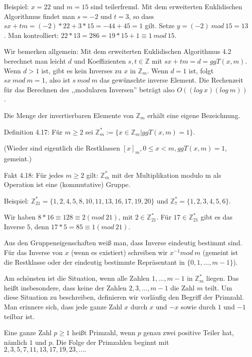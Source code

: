 \documentclass[a4paper]{article}
\begin{document}
\begin{multicols}{3}
    Beispiel: $x=22$ und $m=15$ sind teilerfremd. Mit dem erweiterten Euklidischen Algorithmus findet man $s=-2$ und $t=3$, so dass $sx+tm=(-2)*22 + 3*15 =-44 + 45 = 1$ gilt. Setze $y=(-2)\ mod\ 15 = 13$. Man kontrolliert: $22*13 =286=19 *15 + 1\equiv 1\ mod\ 15$.

    Wir bemerken allgemein: Mit dem erweiterten Euklidischen Algorithmus 4.2 berechnet man leicht $d$ und Koeffizienten $s,t\in\mathbb{Z}$ mit $sx+tm= d= ggT(x,m)$. Wenn $d>1$ ist, gibt es kein Inverses zu $x$ in $\mathbb{Z}_m$. Wenn $d=1$ ist, folgt $sx\ mod\ m=1$, also ist $s\ mod\ m$ das gewünschte inverse Element. Die Rechenzeit für das Berechnen des ,,modularen Inversen'' beträgt also $O((log\ x)(log\ m))$.

    Die Menge der invertierbaren Elemente von $\mathbb{Z}_m$ erhält eine eigene Bezeichnung.

    Definition 4.17: Für $m\geq 2$ sei $\mathbb{Z}^*_m:=\{x\in\mathbb{Z}_m| ggT(x,m)=1\}$.

    (Wieder sind eigentlich die Restklassen $[x]_m, 0\leq x < m, ggT(x,m) = 1$, gemeint.)

    Fakt 4.18: Für jedes $m\geq 2$ gilt: $\mathbb{Z}^*_m$ mit der Multiplikation modulo m als Operation ist eine (kommutative) Gruppe.

    Beispiel: $\mathbb{Z}^*_{21}=\{1,2,4,5,8,10,11,13,16,17,19,20\}$ und $\mathbb{Z}^*_7=\{1,2,3,4,5,6\}$.

    Wir haben $8*16 \equiv 128 \equiv 2 (mod\ 21)$, mit $2\in\mathbb{Z}^*_{21}$. Für $17\in\mathbb{Z}^*_{21}$ gibt es das Inverse $5$, denn $17*5 = 85\equiv 1 (mod\ 21)$.

    Aus den Gruppeneigenschaften weiß man, dass Inverse eindeutig bestimmt sind. Für das Inverse von $x$ (wenn es existiert) schreiben wir $x^{-1} mod\ m$ (gemeint ist die Restklasse oder der eindeutig bestimmte Repräsentant in $\{0,1 ,...,m-1\}$).

    Am schönsten ist die Situation, wenn alle Zahlen $1,...,m-1$ in $\mathbb{Z}^*_m$ liegen. Das heißt insbesondere, dass keine der Zahlen $2, 3 ,...,m-1$ die Zahl $m$ teilt. Um diese Situation zu beschreiben, definieren wir vorläufig den Begriff der Primzahl. Man erinnere sich, dass jede ganze Zahl $x$ durch $x$ und $-x$ sowie durch $1$ und $-1$ teilbar ist.

    Eine ganze Zahl $p\geq 1$ heißt Primzahl, wenn $p$ genau zwei positive Teiler hat, nämlich $1$ und $p$. Die Folge der Primzahlen beginnt mit $2, 3 , 5 , 7 , 11 , 13 , 17 , 19 , 23 ,....$


\end{multicols}
\end{document}
